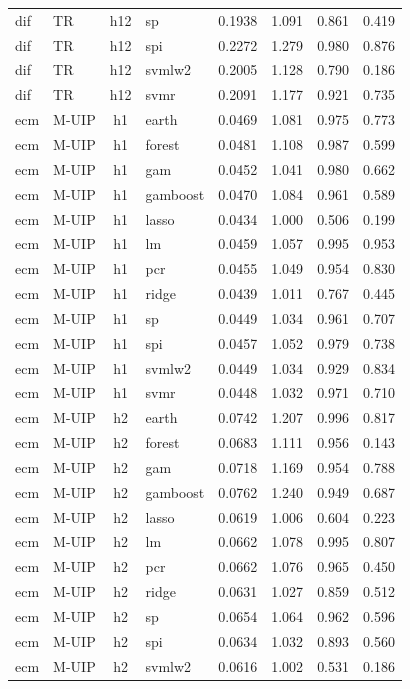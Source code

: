 \begin{ThreePartTable}
\begin{longtable}[t]{llclcccc}
dif & TR & h12 & sp & 0.1938 & 1.091 & 0.861 & 0.419\\
dif & TR & h12 & spi & 0.2272 & 1.279 & 0.980 & 0.876\\
dif & TR & h12 & svmlw2 & 0.2005 & 1.128 & 0.790 & 0.186\\
dif & TR & h12 & svmr & 0.2091 & 1.177 & 0.921 & 0.735\\
\addlinespace
ecm & M-UIP & h1 & earth & 0.0469 & 1.081 & 0.975 & 0.773\\
ecm & M-UIP & h1 & forest & 0.0481 & 1.108 & 0.987 & 0.599\\
ecm & M-UIP & h1 & gam & 0.0452 & 1.041 & 0.980 & 0.662\\
ecm & M-UIP & h1 & gamboost & 0.0470 & 1.084 & 0.961 & 0.589\\
ecm & M-UIP & h1 & lasso & 0.0434 & 1.000 & 0.506 & 0.199\\
ecm & M-UIP & h1 & lm & 0.0459 & 1.057 & 0.995 & 0.953\\
ecm & M-UIP & h1 & pcr & 0.0455 & 1.049 & 0.954 & 0.830\\
ecm & M-UIP & h1 & ridge & 0.0439 & 1.011 & 0.767 & 0.445\\
ecm & M-UIP & h1 & sp & 0.0449 & 1.034 & 0.961 & 0.707\\
ecm & M-UIP & h1 & spi & 0.0457 & 1.052 & 0.979 & 0.738\\
ecm & M-UIP & h1 & svmlw2 & 0.0449 & 1.034 & 0.929 & 0.834\\
ecm & M-UIP & h1 & svmr & 0.0448 & 1.032 & 0.971 & 0.710\\
\addlinespace
ecm & M-UIP & h2 & earth & 0.0742 & 1.207 & 0.996 & 0.817\\
ecm & M-UIP & h2 & forest & 0.0683 & 1.111 & 0.956 & 0.143\\
ecm & M-UIP & h2 & gam & 0.0718 & 1.169 & 0.954 & 0.788\\
ecm & M-UIP & h2 & gamboost & 0.0762 & 1.240 & 0.949 & 0.687\\
ecm & M-UIP & h2 & lasso & 0.0619 & 1.006 & 0.604 & 0.223\\
ecm & M-UIP & h2 & lm & 0.0662 & 1.078 & 0.995 & 0.807\\
ecm & M-UIP & h2 & pcr & 0.0662 & 1.076 & 0.965 & 0.450\\
ecm & M-UIP & h2 & ridge & 0.0631 & 1.027 & 0.859 & 0.512\\
ecm & M-UIP & h2 & sp & 0.0654 & 1.064 & 0.962 & 0.596\\
ecm & M-UIP & h2 & spi & 0.0634 & 1.032 & 0.893 & 0.560\\
ecm & M-UIP & h2 & svmlw2 & 0.0616 & 1.002 & 0.531 & 0.186\\

\end{longtable}
\end{ThreePartTable}

